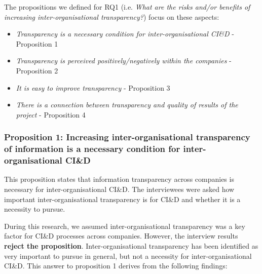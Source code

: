 The propositions we defined for  
RQ1 (i.e. {\em What are the risks and/or benefits of increasing inter-organisational transparency?}) focus on these aspects:

\begin{itemize}
\item {\em Transparency is a necessary condition for  inter-organisational CI\&D} - Proposition 1 %
\item {\em Transparency is perceived positively/negatively within the companies} - Proposition 2 %
\item {\em It is easy to improve transparency} - Proposition 3 %
\item {\em There is a connection between transparency and quality of results of the project} - Proposition 4 %
\end{itemize}

\vspace{.2cm}
\subsubsection{Proposition 1: Increasing inter-organisational transparency of information is a necessary condition for inter-organisational CI\&D}

This proposition states that information transparency across companies is necessary for inter-organisational CI\&D. The interviewees were asked how important inter-organisational transparency is for CI\&D and whether it is a necessity to pursue. 

During this research, we assumed inter-organisational transparency was a key factor for CI\&D processes across companies. However, the interview results {\bf reject the proposition}. Inter-organisational transparency has been identified as very important to pursue in general, but not a necessity for inter-organisational CI\&D. This answer to proposition 1 derives from the following findings:


